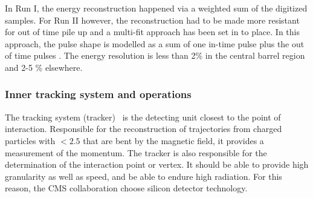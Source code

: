 In Run I, the energy reconstruction happened  via a weighted sum of the digitized samples\cite{Chatrchyan:2013dga}. For Run II however, the reconstruction had to be made more resistant for out of time pile up and a multi-fit approach has been set in to place. In this approach, the pulse shape is modelled as a sum of one in-time pulse plus the out of time pulses \cite{1748-0221-12-01-C01069}. The energy resolution is less than 2\%  in the central barrel region and 2-5 \% elsewhere.

\subsubsection{Inner tracking system and operations}
The tracking system (tracker)~\cite{Chatrchyan:1704291} is the detecting unit closest to the point of interaction. Responsible for the reconstruction of  trajectories from charged particles with \abspsrap $<2.5$ that are bent by the magnetic field, it provides a measurement of the momentum. The tracker is also responsible for the determination of the interaction point or vertex. It should be able to provide high granularity as well as speed, and be able to endure high radiation. For this reason, the CMS collaboration choose silicon detector technology.

